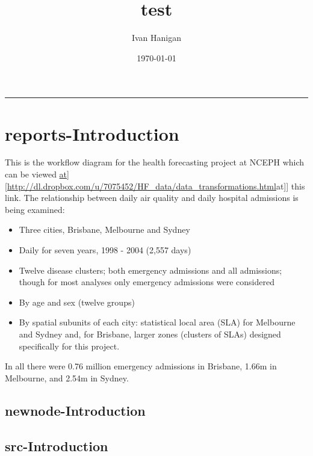 \documentclass[a4paper]{article}
\title{test}
\author{Ivan Hanigan}
\date{\today}
\begin{document}
\maketitle

\tableofcontents
\hrule
\section{reports-Introduction}
\label{sec-1}


 This is the workflow diagram for the health forecasting project at NCEPH \cite{Dear2010} which can be viewed
 \href{[[http://dl.dropbox.com/u/7075452/HF_data/data_transformations.html}{at][http://dl.dropbox.com/u/7075452/HF\_data/data\_transformations.html}{at]] this link}.
 The relationship between daily air quality and daily hospital admissions is being examined:
 \begin{itemize}
 \item Three cities, Brisbane, Melbourne and Sydney
 \item Daily for seven years, 1998 - 2004 (2,557 days)
 \item Twelve disease clusters; both emergency admissions and all admissions; though for most analyses only emergency admissions were considered
 \item By age and sex  (twelve groups)
 \item By spatial subunits of each city: statistical local area (SLA) for Melbourne and Sydney and, for Brisbane, larger zones (clusters of SLAs) designed specifically for this project.
 \end{itemize}
 In all there were 0.76 million emergency admissions in Brisbane, 1.66m in Melbourne, and 2.54m in Sydney.
 
\subsection{newnode-Introduction}
\label{sec-1-1}
\subsection{src-Introduction}
\label{sec-1-2}
\end{document}
